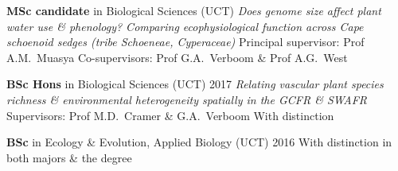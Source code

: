 \begin{hangparas}{2em}{1}

\textbf{MSc candidate} in Biological Sciences (UCT)                       \break
\textit{Does genome size affect plant water use \& phenology?
  Comparing ecophysiological function across                              \break
  Cape schoenoid sedges (tribe Schoeneae, Cyperaceae)}                    \break
Principal supervisor: Prof A.M.~Muasya                                    \break
Co-supervisors: Prof G.A.~Verboom \& Prof A.G.~West

\textbf{BSc Hons} in Biological Sciences (UCT)                \hfill 2017 \break
\textit{Relating vascular plant species richness \&
  environmental heterogeneity spatially in the GCFR \& SWAFR}             \break
Supervisors: Prof M.D.~Cramer \& G.A.~Verboom                             \break
With distinction

\textbf{BSc} in Ecology \& Evolution, Applied Biology (UCT)   \hfill 2016 \break
With distinction in both majors \& the degree

\hfill

\end{hangparas}
